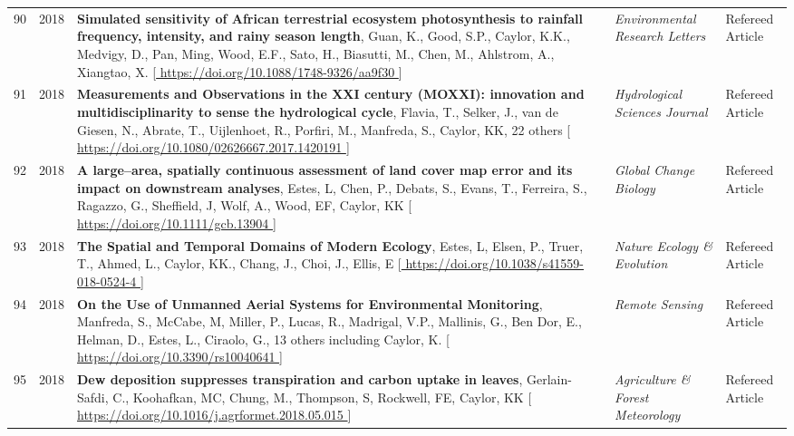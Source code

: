 \begin{supertabular}{lcp{8.25cm}p{4.75cm}p{1.75cm}}
90 & 2018 & {\bf Simulated sensitivity of African terrestrial ecosystem photosynthesis to rainfall frequency, intensity, and rainy season length}, Guan, K., Good, S.P., Caylor, K.K., Medvigy, D., Pan, Ming, Wood, E.F., Sato, H., Biasutti, M., Chen, M., Ahlstrom, A., Xiangtao, X. [\url{ https://doi.org/10.1088/1748-9326/aa9f30 }] & \emph{ Environmental Research Letters } & Refereed Article\\
91 & 2018 & {\bf Measurements and Observations in the XXI century (MOXXI): innovation and multidisciplinarity to sense the hydrological cycle}, Flavia, T., Selker, J., van de Giesen, N., Abrate, T., Uijlenhoet, R., Porfiri, M., Manfreda, S., Caylor, KK, 22 others [\url{ https://doi.org/10.1080/02626667.2017.1420191 }] & \emph{ Hydrological Sciences Journal } & Refereed Article\\
92 & 2018 & {\bf A large--area, spatially continuous assessment of land cover map error and its impact on downstream analyses}, Estes, L, Chen, P., Debats, S., Evans, T., Ferreira, S., Ragazzo, G., Sheffield, J, Wolf, A., Wood, EF, Caylor, KK [\url{ https://doi.org/10.1111/gcb.13904 }] & \emph{ Global Change Biology } & Refereed Article\\
93 & 2018 & {\bf The Spatial and Temporal Domains of Modern Ecology}, Estes, L, Elsen, P., Truer, T., Ahmed, L., Caylor, KK., Chang, J., Choi, J., Ellis, E [\url{ https://doi.org/10.1038/s41559-018-0524-4 }] & \emph{ Nature Ecology \& Evolution } & Refereed Article\\
94 & 2018 & {\bf On the Use of Unmanned Aerial Systems for Environmental Monitoring}, Manfreda, S., McCabe, M, Miller, P., Lucas, R., Madrigal, V.P., Mallinis, G., Ben Dor, E., Helman, D., Estes, L., Ciraolo, G., 13 others including Caylor, K. [\url{ https://doi.org/10.3390/rs10040641 }] & \emph{ Remote Sensing } & Refereed Article\\
95 & 2018 & {\bf Dew deposition suppresses transpiration and carbon uptake in leaves}, Gerlain-Safdi, C., Koohafkan, MC, Chung, M., Thompson, S, Rockwell, FE, Caylor, KK [\url{ https://doi.org/10.1016/j.agrformet.2018.05.015 }] & \emph{ Agriculture \& Forest Meteorology } & Refereed Article\\
\end{supertabular}

